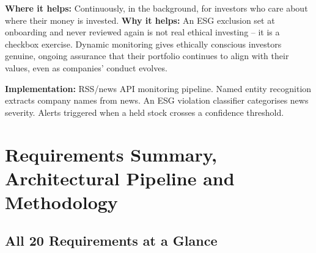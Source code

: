 \documentclass[12pt, a4paper, openany, oneside]{report}
\begin{document}
\begin{valuebox}
\textbf{Where it helps:} Continuously, in the background, for investors who care about where their money is invested. \textbf{Why it helps:} An ESG exclusion set at onboarding and never reviewed again is not real ethical investing -- it is a checkbox exercise. Dynamic monitoring gives ethically conscious investors genuine, ongoing assurance that their portfolio continues to align with their values, even as companies' conduct evolves.
\end{valuebox}

\textbf{Implementation:} RSS/news API monitoring pipeline. Named entity recognition extracts company names from news. An ESG violation classifier categorises news severity. Alerts triggered when a held stock crosses a confidence threshold.

\chapter{Requirements Summary, Architectural Pipeline and Methodology}

\section{All 20 Requirements at a Glance}
\end{document}
